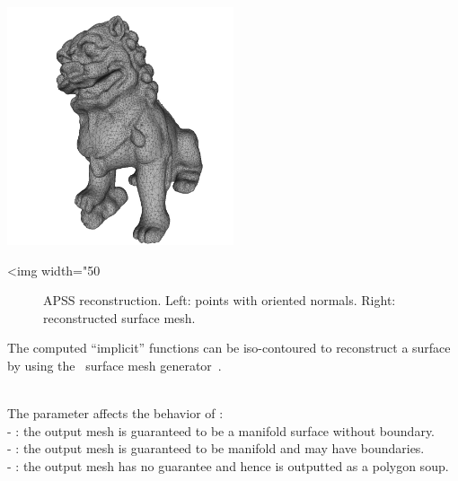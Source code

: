   \\
  \\

\begin{center}
    \label{Surface_reconstruction_3-fig-APSS}
    \begin{ccTexOnly}
        \includegraphics[width=0.5\textwidth]{Surface_reconstruction_3/APSS} %
    \end{ccTexOnly}
    \begin{ccHtmlOnly}
        <img width="50%
    \end{ccHtmlOnly}
    \begin{figure}[h]
        \caption{APSS reconstruction.
        Left: points with oriented normals.
        Right: reconstructed surface mesh.}
    \end{figure}
\end{center}


The computed ``implicit'' functions can be iso-contoured to reconstruct a surface by using the \cgal\ surface mesh generator~\cite{cgal:ry-gsddrm-06,cgal:bo-pgsms-05}.

  \\

The parameter  affects the behavior of : \\
- : the output mesh is guaranteed to be a  manifold surface without boundary.\\
- : the output mesh is guaranteed to be manifold and may have boundaries.\\
- : the output mesh has no guarantee and hence is outputted as a polygon soup.

